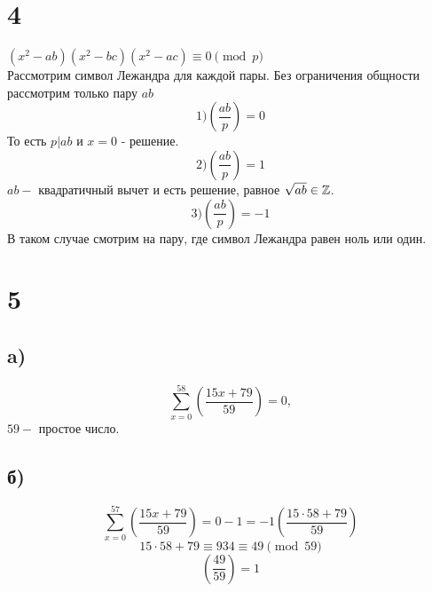 	\section*{4}
	$(x^2-ab)(x^2-bc)(x^2-ac)\equiv0 \pmod p$  \\
	Рассмотрим символ Лежандра для каждой пары. Без ограничения общности рассмотрим только пару $ab$ \\
	$$1) \left(\frac{ab}{p}\right) = 0 $$ То есть $p|ab$ и $x = 0$ - решение.\\
	$$2) \left(\frac{ab}{p}\right) = 1$$ 
	$ab - $ квадратичный вычет и есть решение, равное $\sqrt{ab} \in \mathbb{Z}$.  \\
	$$3) \left(\frac{ab}{p}\right) = -1$$
	В таком случае смотрим на пару, где символ Лежандра равен ноль или один. 
	\section*{5}
	\subsection*{a)}
	$$\sum_{x = 0}^{58} \left(\frac{15x+79}{59}\right) = 0, $$
	$59- $ простое число. 
	\subsection*{б)}
	$$\sum_{x = 0}^{57} \left(\frac{15x+79}{59}\right) = 0-1 = -1 \left(\frac{15\cdot58+79}{59}\right) $$
	$$15\cdot58+79\equiv934\equiv49\pmod{59}$$
	$$\left(\frac{49}{59}\right) =1 $$
